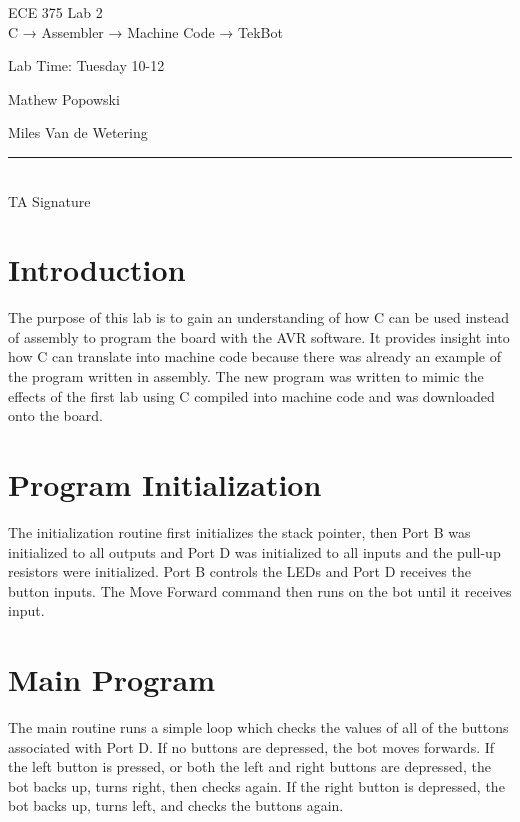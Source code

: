 \documentclass[12pt,letterpaper]{article}
\begin{document}
\begin{titlepage}
    \vspace*{4cm}
    \begin{flushright}
    {\huge
        ECE 375 Lab 2\\[1cm]
    }
    {\large
        C → Assembler → Machine Code → TekBot
    }
    \end{flushright}
    \begin{flushleft}
    Lab Time: Tuesday 10-12
    \end{flushleft}
    \begin{flushright}
    Mathew Popowski

    Miles Van de Wetering
    \vfill
    \rule{5in}{.5mm}\\
    TA Signature
    \end{flushright}

\end{titlepage}

\section{Introduction}
The purpose of this lab is to gain an understanding of how C can be used instead of assembly to program the board with the AVR software. It provides insight into how C can translate into machine code because there was already an example of the program written in assembly. The new program was written to mimic the effects of the first lab using C compiled into machine code and was downloaded onto the board.

\section{Program Initialization}
The initialization routine first initializes the stack pointer, then Port B was initialized to all outputs and Port D was initialized to all inputs and the pull-up resistors were initialized. Port B controls the LEDs and Port D receives the button inputs. The Move Forward command then runs on the bot until it receives input.

\section{Main Program}
The main routine runs a simple loop which checks the values of all of the buttons associated with Port D. If no buttons are depressed, the bot moves forwards. If the left button is pressed, or both the left and right buttons are depressed, the bot backs up, turns right, then checks again. If the right button is depressed, the bot backs up, turns left, and checks the buttons again.
\end{document}
